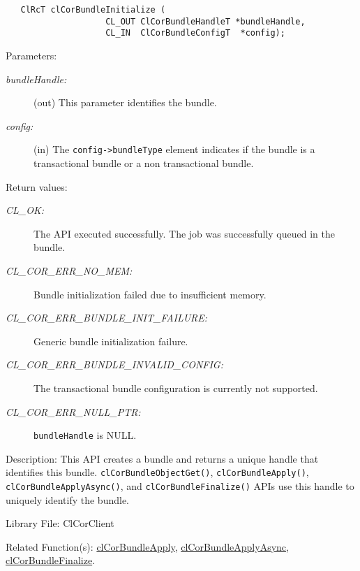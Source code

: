 \begin{flushleft}
\begin{Desc}
\footnotesize\begin{verbatim}   ClRcT clCorBundleInitialize ( 
					CL_OUT ClCorBundleHandleT *bundleHandle,
					CL_IN  ClCorBundleConfigT  *config);
\end{verbatim}
\normalsize
\end{Desc}
\begin{Desc}
\item[Parameters:]
\begin{description}
\item[{\em *bundle\-Handle:}](out) This parameter identifies the bundle.
\item[{\em *config:}](in) The {\tt{config->bundleType}} element indicates if the bundle is a transactional bundle or a non transactional bundle.
\end{description}
\end{Desc}
\begin{Desc}
\item[Return values:]
\begin{description}
\item[{\em CL\_\-OK:}] The API executed successfully. The job was successfully queued in the bundle.
\item[{\em CL\_\-COR\_\-ERR\_\-NO\_\-MEM:}] Bundle initialization failed due to insufficient memory.
\item[{\em CL\_\-COR\_\-ERR\_\-BUNDLE\_\-INIT\_\-FAILURE:}] Generic bundle initialization failure.
\item[{\em CL\_\-COR\_\-ERR\_\-BUNDLE\_\-INVALID\_\-CONFIG:}] The transactional bundle configuration is currently not supported.
\item[{\em CL\_\-COR\_\-ERR\_\-NULL\_\-PTR:}] {\tt{bundleHandle}} is NULL.
\end{description}
\end{Desc}
\begin{Desc}
\item[Description:] This API creates a bundle and returns a unique handle that identifies this bundle. {\tt{clCorBundleObjectGet()}}, 
{\tt{clCorBundleApply()}}, {\tt{clCorBundleApplyAsync()}}, and {\tt{clCorBundleFinalize()}} APIs use this handle to uniquely identify the bundle.

\end{Desc}
\begin{Desc}
\item[Library File:]Cl\-Cor\-Client\end{Desc}
\begin{Desc}
\item[Related Function(s):]\hyperlink{pagecor151}{clCorBundleApply},
\hyperlink{pagecor152}{clCorBundleApplyAsync}, \hyperlink{pagecor154}{clCorBundleFinalize}. 
\end{Desc}
\newpage




\end{flushleft}
